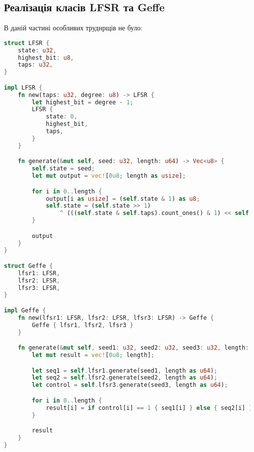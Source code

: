 \documentclass[12pt]{article}
\begin{document}
\subsection{Реалізація класів LFSR та Geffe}
\quad В даній частині особливих труднрщів не було:
\begin{lstlisting}[language=Rust]
struct LFSR {
    state: u32,
    highest_bit: u8,
    taps: u32,
}

impl LFSR {
    fn new(taps: u32, degree: u8) -> LFSR {
        let highest_bit = degree - 1;
        LFSR {
            state: 0,
            highest_bit,
            taps,
        }
    }

    fn generate(&mut self, seed: u32, length: u64) -> Vec<u8> {
        self.state = seed;
        let mut output = vec![0u8; length as usize];

        for i in 0..length {
            output[i as usize] = (self.state & 1) as u8;
            self.state = (self.state >> 1)
                ^ (((self.state & self.taps).count_ones() & 1) << self.highest_bit);
        }

        output
    }
}

struct Geffe {
    lfsr1: LFSR,
    lfsr2: LFSR,
    lfsr3: LFSR,
}

impl Geffe {
    fn new(lfsr1: LFSR, lfsr2: LFSR, lfsr3: LFSR) -> Geffe {
        Geffe { lfsr1, lfsr2, lfsr3 }
    }

    fn generate(&mut self, seed1: u32, seed2: u32, seed3: u32, length: usize) -> Vec<u8> {
        let mut result = vec![0u8; length];

        let seq1 = self.lfsr1.generate(seed1, length as u64);
        let seq2 = self.lfsr2.generate(seed2, length as u64);
        let control = self.lfsr3.generate(seed3, length as u64);

        for i in 0..length {
            result[i] = if control[i] == 1 { seq1[i] } else { seq2[i] };
        }

        result
    }
}
\end{lstlisting}
\end{document}
